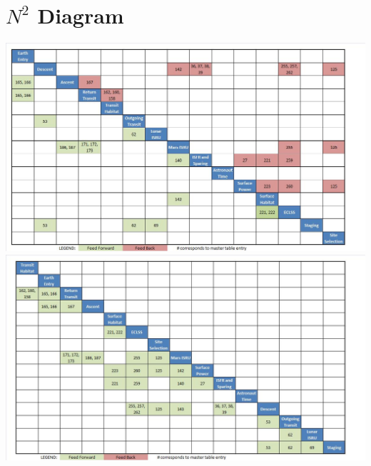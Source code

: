 \documentclass[11pt]{article} %
\begin{document}
\section{$N^2$ Diagram}
\begin{center}
\includegraphics[width=6in]{UnOrdered N2.jpg}
\includegraphics[width=6in]{Ordered N2.jpg}
\end{center}
\end{document}
